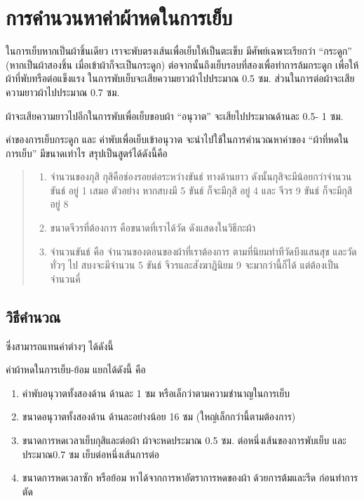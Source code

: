 \section{การคำนวนหาค่าผ้าหดในการเย็บ}

ในการเย็บหากเป็นผ้าชิ้นเดียว เราจะพับตรงเส้นเพื่อเย็บให้เป็นตะเข็บ มีศัพย์เฉพาะเรียกว่า
``กระดูก'' (หากเป็นผ้าสองชิ้น เมื่อเข้าผ้าก็จะเป็นกระดูก)
ต่อจากนั้นถึงเย็บรอบที่สองเพื่อทำการล้มกระดูก เพื่อให้ผ้าที่พับทรือต่อแข็งแรง
ในการพับเย็บจะเสียความยาวผ้าไปประมาณ 0.5 ซม.
ส่วนในการต่อผ้าจะเสียความยาวผ้าไปประมาณ 0.7 ซม.

ผ้าจะเสียความยาวไปอีกในการพับเพื่อเย็บขอบผ้า ``อนุวาต'' จะเสียไปประมาณด้านละ 0.5- 1
ซม.

ค่าของการเย็บกระดูก และ ค่าพับเพื่อเย็บเข้าอนุวาต จะนำไปใช้ในการคำนวณหาค่าของ
``ผ้าที่หดในการเย็บ'' มีขนาดเท่าไร สรุปเป็นสูตร์ได้ดังนี้คือ

\begin{quote}
\begin{enumerate}
\def\labelenumi{(\arabic{enumi})}
\item
  จำนวนของกุสิ กุสิคือช่องรอยต่อระหว่างขันธ์ ทางด้านยาว ดังนั้นกุสิจะมีน้อยกว่าจำนวนขันธ์ อยู่
  1 เสมอ ตัวอย่าง หากสบงมี 5 ขันธ์ ก็จะมีกุสิ อยู่ 4 และ จีวร 9 ขันธ์ ก็จะมีกุสิอยู่ 8
\item
  ขนาดจีวรที่ต้องการ คือขนาดที่เราได้วัด ดังแสดงในวิธีกะผ้า
\item
  จำนวนขันธ์ คือ จำนวนของตอนของผ้าที่เราต้องการ ตามที่นิยมทำทีวัดบึงแสนสุข และวัดทั่วๆ ไป
  สบงจะมีจำนวน 5 ขันธ์ จีวรและสังฆาฎินิยม 9 จะมากว่านี้ก็ได้ แต่ต้องเป็นจำนวนคี่
\end{enumerate}
\end{quote}

\subsection{วิธีคำนวณ}

ซึ่งสามารถแทนค่าต่างๆ ได้ดังนี้

ค่าผ้าหดในการเย็บ-ย้อม แยกได้ดังนี้ คือ

\begin{enumerate}
\def\labelenumi{(\arabic{enumi})}
\item
  ค่าพับอนุวาตทั้งสองด้าน ด้านละ 1 ซม หรือเล็กว่าตามความชำนาญในการเย็บ
\item
  ขนาดอนุวาตทั้งสองด้าน ด้านละอย่างน้อย 16 ซม (ใหญ่เล็กกว่านี้ตามต้องการ)
\item
  ขนาดการหดเวลาเย็บกุสิและต่อผ้า ผ้าจะหดประมาณ 0.5 ซม. ต่อหนึ่งเส้นของการพับเย็บ
  และประมาณ0.7 ซม เย็บต่อหนึ่งเส้นการต่อ
\item
  ขนาดการหดเวลาซัก หรือย้อม หาได้จากการหาอัตราการหดของผ้า ด้วยการต้มและรีด
  ก่อนทำการตัด
\end{enumerate}

